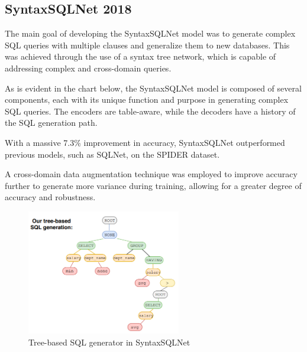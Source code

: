 \subsection{SyntaxSQLNet 2018}

The main\cite{DBLP:journals/corr/abs-1810-05237} goal of developing the SyntaxSQLNet model was to generate complex SQL queries with multiple clauses and generalize them to new databases.
This was achieved through the use of a syntax tree network, which is capable of addressing complex and cross-domain queries.

As is evident in the chart below, the SyntaxSQLNet model is composed of several components, each with its unique function and purpose in generating complex SQL queries. The encoders are table-aware, while the decoders have a history of the SQL generation path.

With a massive 7.3\% improvement in accuracy, SyntaxSQLNet outperformed previous models, such as SQLNet, on the SPIDER dataset.

A cross-domain data augmentation technique was employed to improve accuracy further to generate more variance during training, allowing for a greater degree of accuracy and robustness.

\begin{figure}[htb]
    \centering
    \includegraphics[width=0.6\textwidth]{pics/SyntaxSQLNet/Tree-based.png}
    \caption{Tree-based SQL generator in SyntaxSQLNet}
    \label{fig:tree-based}
\end{figure}

